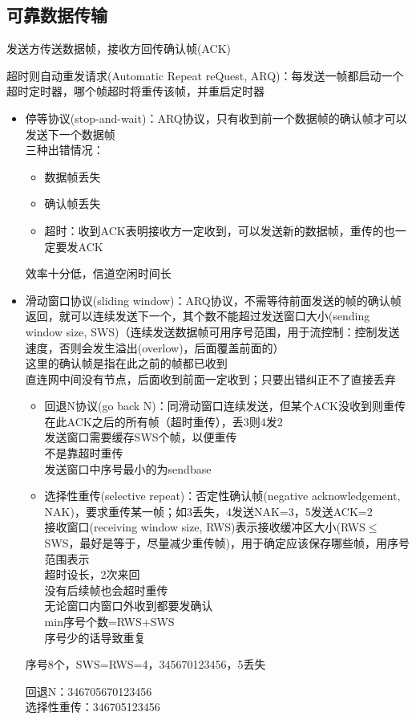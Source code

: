 \subsection{可靠数据传输}
发送方传送数据帧，接收方回传确认帧(ACK)

超时则自动重发请求(Automatic Repeat reQuest, ARQ)：每发送一帧都启动一个超时定时器，哪个帧超时将重传该帧，并重启定时器

\begin{itemize}
	\item 停等协议(stop-and-wait)：ARQ协议，只有收到前一个数据帧的确认帧才可以发送下一个数据帧\\
	三种出错情况：
	\begin{itemize}
		\item 数据帧丢失
		\item 确认帧丢失
		\item 超时：收到ACK表明接收方一定收到，可以发送新的数据帧，重传的也一定要发ACK
	\end{itemize}
	效率十分低，信道空闲时间长
	\item 滑动窗口协议(sliding window)：ARQ协议，不需等待前面发送的帧的确认帧返回，就可以连续发送下一个，其个数不能超过发送窗口大小(sending window size, SWS)（连续发送数据帧可用序号范围，用于流控制：控制发送速度，否则会发生溢出(overlow)，后面覆盖前面的）\\
	这里的确认帧是指在此之前的帧都已收到\\
	直连网中间没有节点，后面收到前面一定收到；只要出错纠正不了直接丢弃
	\begin{itemize}
	\item 回退N协议(go back N)：同滑动窗口连续发送，但某个ACK没收到则重传在此ACK之后的所有帧（超时重传），丢3则4发2\\
	发送窗口需要缓存SWS个帧，以便重传\\
	不是靠超时重传\\
	发送窗口中序号最小的为sendbase
	\item 选择性重传(selective repeat)：否定性确认帧(negative acknowledgement, NAK)，要求重传某一帧；如3丢失，4发送NAK=3，5发送ACK=2\\
	接收窗口(receiving window size, RWS)表示接收缓冲区大小(RWS$\leq$SWS，最好是等于，尽量减少重传帧)，用于确定应该保存哪些帧，用序号范围表示\\
	超时设长，2次来回\\
	没有后续帧也会超时重传\\
	无论窗口内窗口外收到都要发确认\\
	min序号个数=RWS+SWS\\
	序号少的话导致重复
	\end{itemize}
	\begin{example}
	序号8个，SWS=RWS=4，345670123456，5丢失
	\end{example}
	\begin{analysis}
	回退N：346705670123456\\
	选择性重传：346705123456
	\end{analysis}
\end{itemize}


